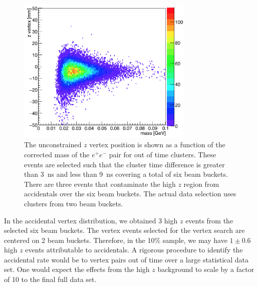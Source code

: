 \begin{figure}[htb]
  \centering
      \includegraphics[width=0.75\textwidth]{pics/searching/zVm_acc_L1L1.png}
  \caption[Vertex position vs mass for the 10$\%$ L1L1 accidentals]{The unconstrained $z$ vertex position is shown as a function of the corrected mass of the $e^+e^-$ pair for out of time clusters. These events are selected such that the cluster time difference is greater than 3~ns and less than 9~ns covering a total of six beam buckets. There are three events that contaminate the high $z$ region from accidentals over the six beam buckets. The actual data selection uses clusters from two beam buckets.}
  \label{fig:zVm_acc}
\end{figure} 

In the accidental vertex distribution, we obtained 3 high $z$ events from the selected six beam buckets. The vertex events selected for the vertex search are centered on 2 beam buckets. Therefore, in the 10$\%$ sample, we may have $1\pm0.6$ high $z$ events attributable to accidentals. A rigorous procedure to identify the accidental rate would be to vertex pairs out of time over a large statistical data set. One would expect the effects from the high $z$ background to scale by a factor of 10 to the final full data set. 